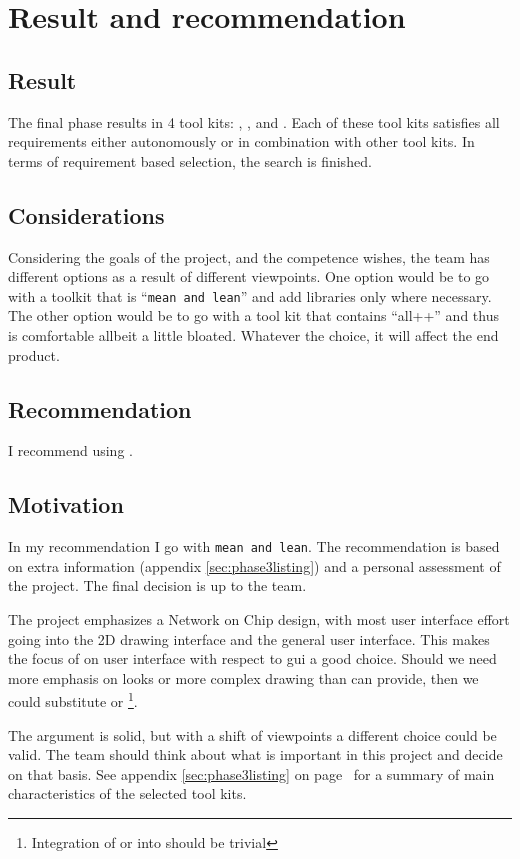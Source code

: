 \section{Result and recommendation}
\label{sec:recommendation}

\subsection{Result}

The final phase results in 4 tool kits: , ,  and
. Each of these tool kits satisfies all requirements either
autonomously or in combination with other tool kits. In terms of requirement
based selection, the search is finished.

\subsection{Considerations}

Considering the goals of the project, and the competence wishes, the team
has different options as a result of different viewpoints.  One option would be
to go with a toolkit that is ``\texttt{mean and lean}'' and add libraries only
where necessary. The other option would be to go with a tool kit that contains
``all++'' and thus is comfortable allbeit a little bloated. Whatever the
choice, it will affect the end product. 
\subsection{Recommendation} 

I recommend using .

\subsection{Motivation}

In my recommendation I go with \texttt{mean and lean}.  The recommendation is
based on extra information (appendix \ref{sec:phase3listing}) and a personal
assessment of the project. The final decision is up to the team.

The project emphasizes a Network on Chip design, with most user interface
effort going into the 2D drawing interface and the general user interface.
This makes the focus of  on user interface with respect to gui a good
choice. Should we need more emphasis on looks or more complex drawing than
 can provide, then we could substitute  or
\footnote{Integration of  or  into  should
be trivial}.

\par The argument is solid, but with a shift of viewpoints a different
choice could be valid.  The team should think about what is
important in this project and decide on that basis. See appendix
\ref{sec:phase3listing} on page~\pageref{sec:phase3listing} for a summary of
main characteristics of the selected tool kits.

